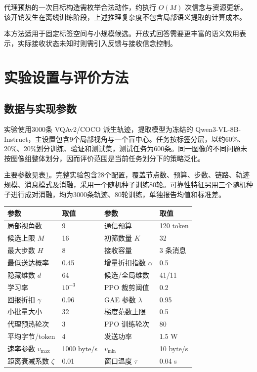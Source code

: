 代理预热的一次目标构造需枚举合法动作，约执行 $O(M)$ 次信念与资源更新。该开销发生在离线训练阶段，上述推理复杂度不包含局部语义提取的计算成本。

本方法适用于固定标签空间与小规模候选。开放式回答需要更丰富的语义效用表示，实际接收状态未知时则需引入反馈与接收信念控制。

\section{实验设置与评价方法}
\label{rq2:sec:setup}
\subsection{数据与实现参数}
实验使用3000条 VQAv2/COCO 派生轨迹，提取模型为冻结的 Qwen3-VL-8B-Instruct，主设置包含9个局部视角与一个盲中心。任务按标签分层，以约60\%、20\%、20\%划分训练、验证和测试集，测试任务为600条。同一图像的不同问题未按图像组整体划分，因而评价范围是当前任务划分下的策略泛化。

主要参数见表\ref{rq2:tab:parameters}。完整实验包含28个配置，覆盖节点数、预算、步数、链路、轨迹规模、消息模式及消融，采用一个随机种子训练80轮。可靠性特征另用三个随机种子进行成对消融，均为3000条轨迹、80轮训练，单独报告均值和标准差。

\begin{table}[htbp]
\centering
{}
\label{rq2:tab:parameters}
\begin{tabular}{ll ll}
\toprule
参数 & 取值 & 参数 & 取值\\
\midrule
局部视角数 & 9 & 通信预算 & 120 token\\
候选上限 $M$ & 16 & 初筛数量 $K$ & 32\\
最大步数 $H$ & 8 & 接收容量 & 3 条消息\\
最低送达概率 & 0.45 & 增量折扣指数 $\alpha$ & 0.5\\
隐藏维数 $d$ & 64 & 候选/全局维数 & 41/11\\
学习率 & $10^{-3}$ & PPO 裁剪阈值 & 0.2\\
回报折扣 $\gamma$ & 0.96 & GAE 参数 $\lambda$ & 0.95\\
小批量大小 & 32 & 梯度范数上限 & 0.5\\
代理预热轮次 & 3 & PPO 训练轮次 & 80\\
平均字节/token & 4 & 发送功率 & 1.5 W\\
速率参数 $v_{\max}$ & 1000 byte/s & $v_{\min}$ & 10 byte/s\\
距离衰减系数 $\zeta$ & 0.01 & 窗口温度 $\tau$ & 0.04 s\\
\bottomrule
\end{tabular}
\end{table}

